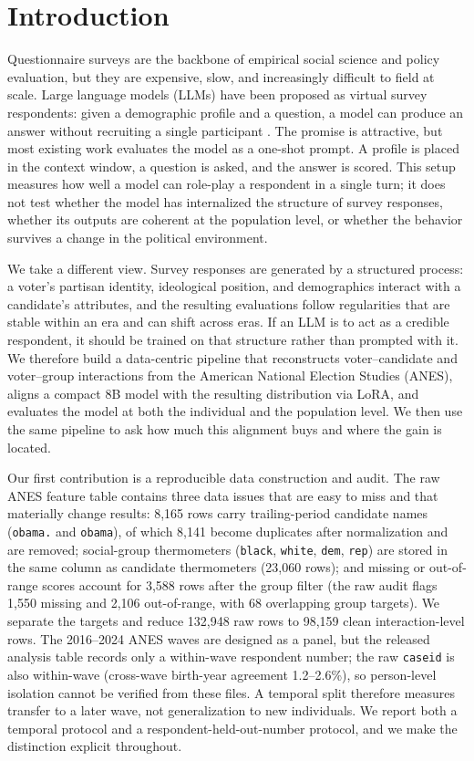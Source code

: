 \section{Introduction}\label{introduction}

Questionnaire surveys are the backbone of empirical social science and
policy evaluation, but they are expensive, slow, and increasingly
difficult to field at scale. Large language models (LLMs) have been
proposed as virtual survey respondents: given a demographic profile and
a question, a model can produce an answer without recruiting a single
participant
\citep{argyle2023, aher2023multiple, dillion2023, kim2023, tourangeau2000survey}.
The promise is attractive, but most existing work evaluates the model as
a one-shot prompt. A profile is placed in the context window, a question
is asked, and the answer is scored. This setup measures how well a model
can role-play a respondent in a single turn; it does not test whether
the model has internalized the structure of survey responses, whether
its outputs are coherent at the population level, or whether the
behavior survives a change in the political environment.

We take a different view. Survey responses are generated by a structured
process: a voter's partisan identity, ideological position, and
demographics interact with a candidate's attributes, and the resulting
evaluations follow regularities that are stable within an era and can
shift across eras. If an LLM is to act as a credible respondent, it
should be trained on that structure rather than prompted with it. We
therefore build a data-centric pipeline that reconstructs
voter--candidate and voter--group interactions from the American
National Election Studies (ANES), aligns a compact 8B model with the
resulting distribution via LoRA, and evaluates the model at both the
individual and the population level. We then use the same pipeline to
ask how much this alignment buys and where the gain is located.

Our first contribution is a reproducible data construction and audit.
The raw ANES feature table contains three data issues that are easy to
miss and that materially change results: 8,165 rows carry
trailing-period candidate names (\texttt{obama.} and \texttt{obama}), of
which 8,141 become duplicates after normalization and are removed;
social-group thermometers (\texttt{black}, \texttt{white}, \texttt{dem},
\texttt{rep}) are stored in the same column as candidate thermometers
(23,060 rows); and missing or out-of-range scores account for 3,588 rows
after the group filter (the raw audit flags 1,550 missing and 2,106
out-of-range, with 68 overlapping group targets). We separate the
targets and reduce 132,948 raw rows to 98,159 clean interaction-level
rows. The 2016--2024 ANES waves are designed as a panel, but the
released analysis table records only a within-wave respondent number;
the raw \texttt{caseid} is also within-wave (cross-wave birth-year
agreement 1.2--2.6\%), so person-level isolation cannot be verified from
these files. A temporal split therefore measures transfer to a later
wave, not generalization to new individuals. We report both a temporal
protocol and a respondent-held-out-number protocol, and we make the
distinction explicit throughout.

